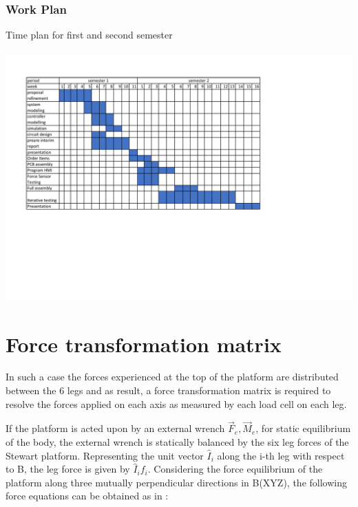  \subsubsection{Work Plan}
 \begin{center}
 \begin{table}[!h]
 \centering
 \caption[Time plan]{Time plan for first and second semester}
 \paragraph{ }
 \includegraphics[width=0.95\linewidth]{Figures/workplan}
 \end{table}
 \end{center}
 \clearpage
 
\section{Force transformation matrix} 
In such a case the forces experienced at the top of the platform are distributed between the 6 legs and as result, a force transformation matrix is required to resolve the forces applied on each axis as measured by each load cell on each leg. 

If the platform is acted upon by an external wrench {$\vec{F}_e, \vec{M}_e$}, for static equilibrium of the body, the external wrench is statically balanced by the six leg forces of the Stewart platform. Representing the unit vector $\hat{I}_i$ along the i-th leg with respect to B, the leg force is given  by $\hat{I}_if_i$. Considering the force equilibrium of the platform along  three mutually perpendicular directions in B(XYZ), the following force equations can be obtained as in \cite{dwarakanath_design_2001}:

